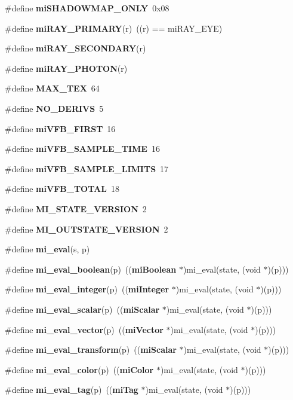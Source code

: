 \begin{CompactItemize}
\#define {\bf mi\-SHADOWMAP\_\-ONLY}\ 0x08
\item 
\#define {\bf mi\-RAY\_\-PRIMARY}(r)\ ((r) == mi\-RAY\_\-EYE)
\item 
\#define {\bf mi\-RAY\_\-SECONDARY}(r)
\item 
\#define {\bf mi\-RAY\_\-PHOTON}(r)
\item 
\#define {\bf MAX\_\-TEX}\ 64
\item 
\#define {\bf NO\_\-DERIVS}\ 5
\item 
\#define {\bf mi\-VFB\_\-FIRST}\ 16
\item 
\#define {\bf mi\-VFB\_\-SAMPLE\_\-TIME}\ 16
\item 
\#define {\bf mi\-VFB\_\-SAMPLE\_\-LIMITS}\ 17
\item 
\#define {\bf mi\-VFB\_\-TOTAL}\ 18
\item 
\#define {\bf MI\_\-STATE\_\-VERSION}\ 2
\item 
\#define {\bf MI\_\-OUTSTATE\_\-VERSION}\ 2
\item 
\#define {\bf mi\_\-eval}(s, p)
\item 
\#define {\bf mi\_\-eval\_\-boolean}(p)\ (({\bf mi\-Boolean} $\ast$)mi\_\-eval(state, (void $\ast$)(p)))
\item 
\#define {\bf mi\_\-eval\_\-integer}(p)\ (({\bf mi\-Integer} $\ast$)mi\_\-eval(state, (void $\ast$)(p)))
\item 
\#define {\bf mi\_\-eval\_\-scalar}(p)\ (({\bf mi\-Scalar}  $\ast$)mi\_\-eval(state, (void $\ast$)(p)))
\item 
\#define {\bf mi\_\-eval\_\-vector}(p)\ (({\bf mi\-Vector}  $\ast$)mi\_\-eval(state, (void $\ast$)(p)))
\item 
\#define {\bf mi\_\-eval\_\-transform}(p)\ (({\bf mi\-Scalar}  $\ast$)mi\_\-eval(state, (void $\ast$)(p)))
\item 
\#define {\bf mi\_\-eval\_\-color}(p)\ (({\bf mi\-Color}   $\ast$)mi\_\-eval(state, (void $\ast$)(p)))
\item 
\#define {\bf mi\_\-eval\_\-tag}(p)\ (({\bf mi\-Tag}     $\ast$)mi\_\-eval(state, (void $\ast$)(p)))
\end{CompactItemize}
